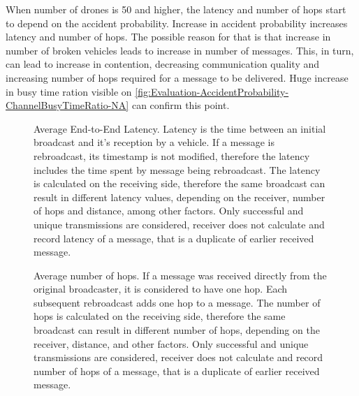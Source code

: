 \documentclass[]{nsm-thesis}
\begin{document}
When number of drones is 50 and higher, the latency and number of hops start to depend on the accident probability. Increase in accident probability increases latency and number of hops. The possible reason for that is that increase in number of broken vehicles leads to increase in number of messages. This, in turn, can lead to increase in contention, decreasing communication quality and increasing number of hops required for a message to be delivered. Huge increase in busy time ration visible on \cref{fig:Evaluation-AccidentProbability-ChannelBusyTimeRatio-NA} can confirm this point.

\begin{figure}%
	\centering
	\hfill
	\hfill
	\caption{Average End-to-End Latency. Latency is the time between an initial broadcast and it's reception by a vehicle. If a message is rebroadcast, its timestamp is not modified, therefore the latency includes the time spent by message being rebroadcast. The latency is calculated on the receiving side, therefore the same broadcast can result in different latency values, depending on the receiver, number of hops and distance, among other factors. Only successful and unique transmissions are considered, receiver does not calculate and record latency of a message, that is a duplicate of earlier received message.}%
	\label{fig:Evaluation-Latency}%
\end{figure}

\begin{figure}%
	\centering
	\hfill
	\hfill
	\caption{Average number of hops. If a message was received directly from the original broadcaster, it is considered to have one hop. Each subsequent rebroadcast adds one hop to a message. The number of hops is calculated on the receiving side, therefore the same broadcast can result in different number of hops, depending on the receiver, distance, and other factors. Only successful and unique transmissions are considered, receiver does not calculate and record number of hops of a message, that is a duplicate of earlier received message.}%
	\label{fig:Evaluation-Latency}%
\end{figure}
\end{document}
